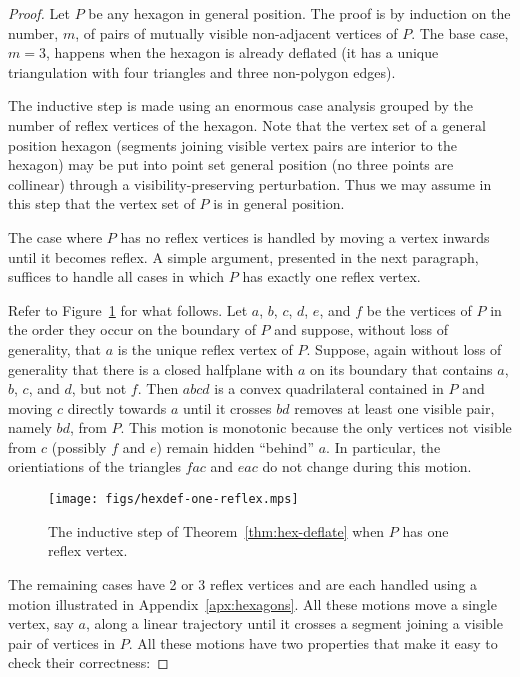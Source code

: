 \documentclass{patmorin}
\begin{document}
\begin{proof}
  Let $P$ be any hexagon in general position.  The proof is by
  induction on the number, $m$, of pairs of mutually visible
  non-adjacent vertices of $P$.  The base case, $m=3$, happens when
  the hexagon is already deflated (it has a unique triangulation with
  four triangles and three non-polygon edges).

  The inductive step is made using an enormous case analysis grouped
  by the number of reflex vertices of the hexagon.  Note that the
  vertex set of a general position hexagon (segments joining visible
  vertex pairs are interior to the hexagon) may be put into point set
  general position (no three points are collinear) through a
  visibility-preserving perturbation.  Thus we may assume in this step
  that the vertex set of $P$ is in general position.

  The case where $P$ has no reflex vertices is handled by moving a
  vertex inwards until it becomes reflex.  A simple argument,
  presented in the next paragraph, suffices to handle all cases in
  which $P$ has exactly one reflex vertex.

  Refer to Figure~\ref{fig:hexdef-one-reflex} for what follows.  Let
  $a$, $b$, $c$, $d$, $e$, and $f$ be the vertices of $P$ in the order
  they occur on the boundary of $P$ and suppose, without loss of
  generality, that $a$ is the unique reflex vertex of $P$.  Suppose,
  again without loss of generality that there is a closed halfplane
  with $a$ on its boundary that contains $a$, $b$, $c$, and $d$, but
  not $f$. Then $abcd$ is a convex quadrilateral contained in $P$ and
  moving $c$ directly towards $a$ until it crosses $bd$ removes at
  least one visible pair, namely $bd$, from $P$.  This motion is
  monotonic because the only vertices not visible from $c$ (possibly
  $f$ and $e$) remain hidden ``behind'' $a$.  In particular, the
  orientiations of the triangles $fac$ and $eac$ do not change during
  this motion.

  \begin{figure}[htb]
    \centering
    \texttt{[image: figs/hexdef-one-reflex.mps]}
    \caption{The inductive step of Theorem~\ref{thm:hex-deflate} when $P$ has
      one reflex vertex.}
    \label{fig:hexdef-one-reflex}
  \end{figure}

  The remaining cases have 2 or 3 reflex vertices and are each handled
  using a motion illustrated in Appendix~\ref{apx:hexagons}.  All
  these motions move a single vertex, say $a$, along a linear
  trajectory until it crosses a segment joining a visible pair of
  vertices in $P$.  All these motions have two properties that make it
  easy to check their correctness:


\end{proof}
\end{document}

